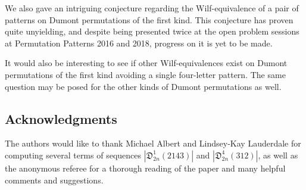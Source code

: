 \documentclass[
final
]{dmtcs-episciences}
\theoremstyle{definition}
\theoremstyle{remark}
\begin{document}
We also gave an intriguing conjecture regarding the Wilf-equivalence of a pair of patterns on Dumont permutations of the first kind. This conjecture has proven quite unyielding, and despite being presented twice at the open problem sessions at Permutation Patterns 2016 and 2018, progress on it is yet to be made. 

It would also be interesting to see if other Wilf-equivalences exist on Dumont permutations of the first kind avoiding a single four-letter pattern. The same question may be posed for the other kinds of Dumont permutations as well.


\subsection*{Acknowledgments}

The authors would like to thank Michael Albert and Lindsey-Kay Lauderdale for computing several terms of sequences $|\mathfrak{D}^1_{2n} (2143)|$ and $|\mathfrak{D}^4_{2n} (312)|$, as well as the anonymous referee for a thorough reading of the paper and many helpful comments and suggestions.

\end{document}
